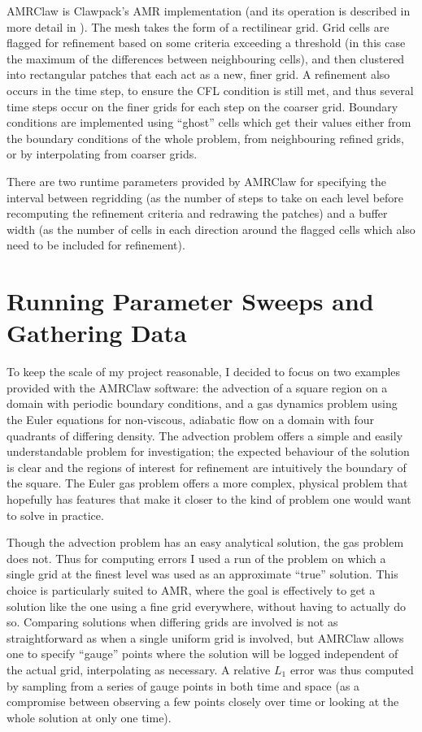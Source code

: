 \documentclass[11pt]{article}
\begin{document}
AMRClaw is Clawpack's AMR implementation (and its operation is described
in more detail in \cite{BergerLeVeque98}). The mesh takes the form of a 
rectilinear grid. Grid cells are flagged for refinement based on some criteria
exceeding a threshold (in this case the maximum of the differences between
neighbouring cells), and then clustered into rectangular patches that each
act as a new, finer grid. A refinement also occurs in the time step, to
ensure the CFL condition is still met, and thus several time steps occur
on the finer grids for each step on the coarser grid. Boundary conditions
are implemented using ``ghost'' cells which get their values either from
the boundary conditions of the whole problem, from neighbouring refined grids, 
or by interpolating from coarser grids.

There are two runtime parameters provided by AMRClaw for specifying the
interval between regridding (as the number of steps to take on each
level before recomputing the refinement criteria and redrawing the patches)
and a buffer width (as the number of cells in each direction around the
flagged cells which also need to be included for refinement).

\section*{Running Parameter Sweeps and Gathering Data}
To keep the scale of my project reasonable, I decided to focus on two examples
provided with the AMRClaw software: the advection of a square region on a domain
with periodic boundary conditions, and a gas dynamics problem using the Euler
equations for non-viscous, adiabatic flow on a domain with four quadrants of
differing density. The advection problem offers a simple and easily understandable
problem for investigation; the expected behaviour of the solution is clear and
the regions of interest for refinement are intuitively the boundary of the square.
The Euler gas problem offers a more complex, physical problem that hopefully has
features that make it closer to the kind of problem one would want to solve
in practice.

Though the advection problem has an easy analytical solution, the gas problem
does not. Thus for computing errors I used a run of the problem on which a 
single grid at the finest level was used as an approximate ``true'' solution.
This choice is particularly suited to AMR, where the goal is effectively to
get a solution like the one using a fine grid everywhere, without having to 
actually do so. Comparing solutions when differing grids are involved is not
as straightforward as when a single uniform grid is involved, but AMRClaw 
allows one to specify ``gauge'' points where the solution will be logged
independent of the actual grid, interpolating as necessary.
A relative $L_1$ error was thus computed by sampling from a series of gauge
points in both time and space (as a compromise between observing a few points
closely over time or looking at the whole solution at only one time).
\end{document}
